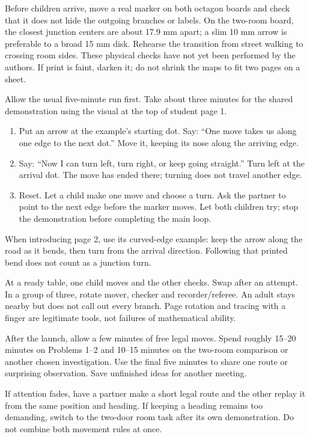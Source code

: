 \documentclass[11pt]{article}
\newcommand{\topic}[1]{\vspace{4pt}{\large\bfseries #1}\par}
\begin{document}
Before children arrive, move a real marker on both octagon boards and check that it does not hide the outgoing branches or labels. On the two-room board, the closest junction centers are about 17.9 mm apart; a slim 10 mm arrow is preferable to a broad 15 mm disk. Rehearse the transition from street walking to crossing room sides. These physical checks have not yet been performed by the authors. If print is faint, darken it; do not shrink the maps to fit two pages on a sheet.

\topic{A short launch, then children take over}
Allow the usual five-minute run first. Take about three minutes for the shared demonstration using the visual at the top of student page 1.
\begin{enumerate}
\item Put an arrow at the example's starting dot. Say: ``One move takes us along one edge to the next dot.'' Move it, keeping its nose along the arriving edge.
\item Say: ``Now I can turn left, turn right, or keep going straight.'' Turn left at the arrival dot. The move has ended there; turning does not travel another edge.
\item Reset. Let a child make one move and choose a turn. Ask the partner to point to the next edge before the marker moves. Let both children try; stop the demonstration before completing the main loop.
\end{enumerate}
When introducing page 2, use its curved-edge example: keep the arrow along the road as it bends, then turn from the arrival direction. Following that printed bend does not count as a junction turn.

At a ready table, one child moves and the other checks. Swap after an attempt. In a group of three, rotate mover, checker and recorder/referee. An adult stays nearby but does not call out every branch. Page rotation and tracing with a finger are legitimate tools, not failures of mathematical ability.

\topic{A manageable hour}
After the launch, allow a few minutes of free legal moves. Spend roughly 15--20 minutes on Problems 1--2 and 10--15 minutes on the two-room comparison or another chosen investigation. Use the final five minutes to share one route or surprising observation. Save unfinished ideas for another meeting.

If attention fades, have a partner make a short legal route and the other replay it from the same position and heading. If keeping a heading remains too demanding, switch to the two-door room task after its own demonstration. Do not combine both movement rules at once.
\newpage
\end{document}

